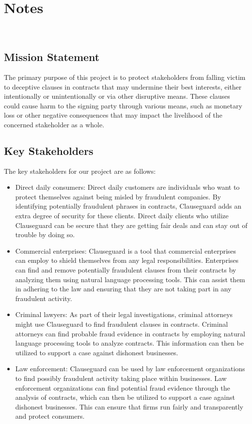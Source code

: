 \chapter{Notes 
\label{Chapter::Notes}}\
\section{Mission Statement \label{Section::Mission Statement} }
The primary purpose of this project is to protect stakeholders from falling victim to deceptive clauses in contracts that may undermine their best interests, either intentionally or unintentionally or via other disruptive means. These clauses could cause harm to the signing party through various means, such as monetary loss or other negative consequences that may impact the livelihood of the concerned stakeholder as a whole. 

\section{Key Stakeholders \cite{DMuresanStakeholders} \label{Section::Key Stakeholders} }
The key stakeholders for our project are as follows: 
\begin{itemize}
    \item Direct daily consumers: Direct daily customers are individuals who want to protect themselves against being misled by fraudulent companies. By identifying potentially fraudulent phrases in contracts, Clauseguard adds an extra degree of security for these clients. Direct daily clients who utilize Clauseguard can be secure that they are getting fair deals and can stay out of trouble by doing so.
    \item Commercial enterprises: Clauseguard is a tool that commercial enterprises can employ to shield themselves from any legal responsibilities. Enterprises can find and remove potentially fraudulent clauses from their contracts by analyzing them using natural language processing tools. This can assist them in adhering to the law and ensuring that they are not taking part in any fraudulent activity.
    \item Criminal lawyers: As part of their legal investigations, criminal attorneys might use Clauseguard to find fraudulent clauses in contracts. Criminal attorneys can find probable fraud evidence in contracts by employing natural language processing tools to analyze contracts. This information can then be utilized to support a case against dishonest businesses.
    \item Law enforcement: Clauseguard can be used by law enforcement organizations to find possibly fraudulent activity taking place within businesses. Law enforcement organizations can find potential fraud evidence through the analysis of contracts, which can then be utilized to support a case against dishonest businesses. This can ensure that firms run fairly and transparently and protect consumers.
\end{itemize}




